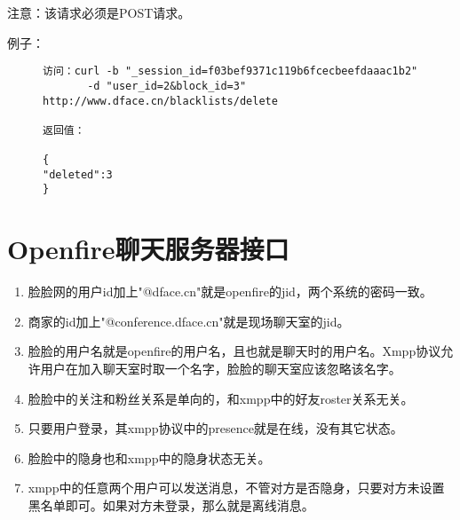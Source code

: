 \documentclass[cs4size]{ctexartutf8}
\begin{document}
注意：该请求必须是POST请求。

例子：

\begin{figure}[H]
\begin{verbatim}
访问：curl -b "_session_id=f03bef9371c119b6fcecbeefdaaac1b2"
       -d "user_id=2&block_id=3" http://www.dface.cn/blacklists/delete

返回值：

{
"deleted":3
}

\end{verbatim}
\end{figure}




\section{Openfire聊天服务器接口}




\begin{enumerate}
\item 脸脸网的用户id加上"@dface.cn"就是openfire的jid，两个系统的密码一致。
\item 商家的id加上"@conference.dface.cn"就是现场聊天室的jid。
\item 脸脸的用户名就是openfire的用户名，且也就是聊天时的用户名。Xmpp协议允许用户在加入聊天室时取一个名字，脸脸的聊天室应该忽略该名字。
\item 脸脸中的关注和粉丝关系是单向的，和xmpp中的好友roster关系无关。
\item 只要用户登录，其xmpp协议中的presence就是在线，没有其它状态。
\item 脸脸中的隐身也和xmpp中的隐身状态无关。
\item xmpp中的任意两个用户可以发送消息，不管对方是否隐身，只要对方未设置黑名单即可。如果对方未登录，那么就是离线消息。
\end{enumerate}



\newpage
\end{document}
